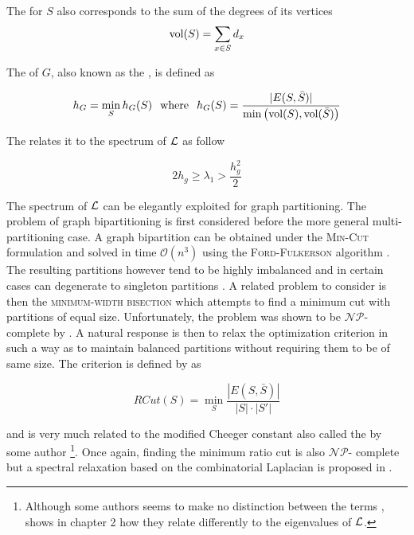 The  for $S$ also corresponds to the sum of the degrees of its vertices
\begin{equation}
\operatorname{\text{vol}}(S) = \sum_{x \in S} d_x
\end{equation}

The  of $G$, also known as the  \parencite{Chung1997}, is defined as

\begin{equation}
h_G = \min_S h_G(S) \hspace{2.5mm} \text{where} \hspace{2.5mm} h_G(S) = \frac{ |E(S, \bar{S}) |}{\min \left( \operatorname{\text{vol}}(S), \operatorname{\text{vol}}(\bar{S}) \right)}
\label{eq:cheeger-constant}
\end{equation}

The  relates it to the spectrum of $\mathbf{\mathcal{L}}$ as follow \parencite{Chung1997}
\begin{lem}
\begin{equation}
2h_g \geq \lambda_1 > \frac{h_g^2}{2}
\end{equation}
\end{lem}

The spectrum of $\mathbf{\mathcal{L}}$ can be elegantly exploited for graph partitioning. The problem of graph bipartitioning is first considered before the more general multi-partitioning case. A graph bipartition can be obtained under the \textsc{Min-Cut} formulation and solved in time
$\mathcal{O}(n^3)$ using the \textsc{Ford-Fulkerson} algorithm \parencite{FordFulkerson1956}. The
resulting partitions however tend to be highly imbalanced and in certain cases can
degenerate to singleton partitions \parencite{Hagen1992}. A related problem to consider is
then the \textsc{minimum-width bisection} which attempts to find a minimum cut
with partitions of equal size. Unfortunately, the problem was shown to be
$\mathcal{NP}$-complete by \cite{Garey1976}. A natural response is then to relax the
optimization criterion in such a way as to maintain balanced partitions without requiring
them to be of same size. The  criterion is defined by \cite{Chuen1989, Chuen1991, Hagen1992}  as

\begin{equation}
RCut(S) = \min_S \frac{|E(S, \bar{S})|}{|S| \cdot |S'|}
\end{equation}

and is very much related to the modified Cheeger constant 
also called the  by some author \footnote{Although some authors seems
to make no distinction between the terms \parencite{ShiMalik2000, Levin2008},
\cite{Chung1997} shows in chapter 2 how they relate differently to the eigenvalues of
$\mathbf{\mathcal{L}}$.}. Once again,  finding the minimum ratio cut is also $\mathcal{NP}$-
complete but a spectral relaxation based on the combinatorial Laplacian is proposed in \cite{Hagen1992}.

